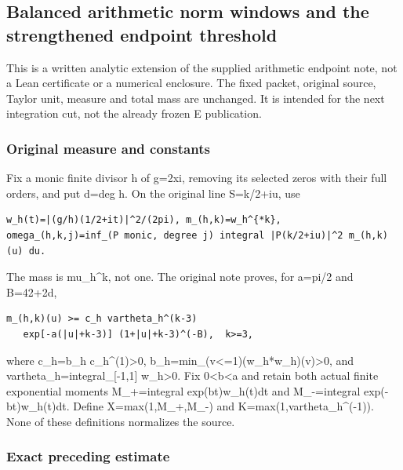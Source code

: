 \subsection{Balanced arithmetic norm windows and the strengthened endpoint threshold}\label{endpoint-balanced_window--balanced-arithmetic-norm-windows-and-the-strengthened-endpoint-threshold}

This is a written analytic extension of the supplied arithmetic endpoint note, not a Lean certificate or a numerical enclosure. The fixed packet, original source, Taylor unit, measure and total mass are unchanged. It is intended for the next integration cut, not the already frozen E publication.

\subsubsection{Original measure and constants}\label{endpoint-balanced_window--original-measure-and-constants}

Fix a monic finite divisor h of g=2xi, removing its selected zeros with their full orders, and put d=deg h. On the original line S=k/2+iu, use

\begin{verbatim}
w_h(t)=|(g/h)(1/2+it)|^2/(2pi), m_(h,k)=w_h^{*k},
omega_(h,k,j)=inf_(P monic, degree j) integral |P(k/2+iu)|^2 m_(h,k)(u) du.
\end{verbatim}

The mass is mu\_h\^{}k, not one. The original note proves, for a=pi/2 and B=42+2d,

\begin{verbatim}
m_(h,k)(u) >= c_h vartheta_h^(k-3)
   exp[-a(|u|+k-3)] (1+|u|+k-3)^(-B),  k>=3,
\end{verbatim}

where c\_h=b\_h c\_h\^{}(1)\textgreater0, b\_h=min\_(\textbar v\textbar\textless=1)(w\_h*w\_h)(v)\textgreater0, and vartheta\_h=integral\_{[}-1,1{]} w\_h\textgreater0. Fix 0\textless b\textless a and retain both actual finite exponential moments M\_+=integral exp(bt)w\_h(t)dt and M\_-=integral exp(-bt)w\_h(t)dt. Define X=max(1,M\_+,M\_-) and K=max(1,vartheta\_h\^{}(-1)). None of these definitions normalizes the source.

\subsubsection{Exact preceding estimate}\label{endpoint-balanced_window--exact-preceding-estimate}

